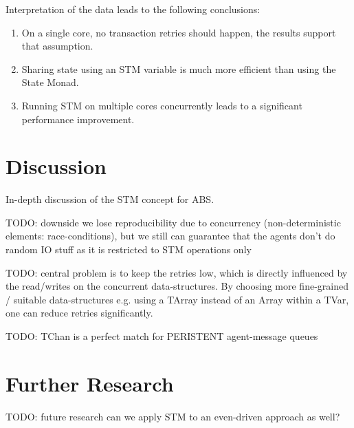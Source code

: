 Interpretation of the data leads to the following conclusions:
\begin{enumerate}
	\item On a single core, no transaction retries should happen, the results support that assumption.
	\item Sharing state using an STM variable is much more efficient than using the State Monad.
	\item Running STM on multiple cores concurrently leads to a significant performance improvement.
\end{enumerate}

\section{Discussion}
\label{sect:stm_discussion}
In-depth discussion of the STM concept for ABS.

TODO: downside we lose reproducibility due to concurrency (non-deterministic elements: race-conditions), but we still can guarantee that the agents don't do random IO stuff as it is restricted to STM operations only

TODO: central problem is to keep the retries low, which is directly influenced by the read/writes on the concurrent data-structures. By choosing more fine-grained / suitable data-structures e.g. using a TArray instead of an Array within a TVar, one can reduce retries significantly.

TODO: TChan is a perfect match for PERISTENT agent-message queues

\section{Further Research}
\label{sect:stm_further}
TODO: future research can we apply STM to an even-driven approach as well?

